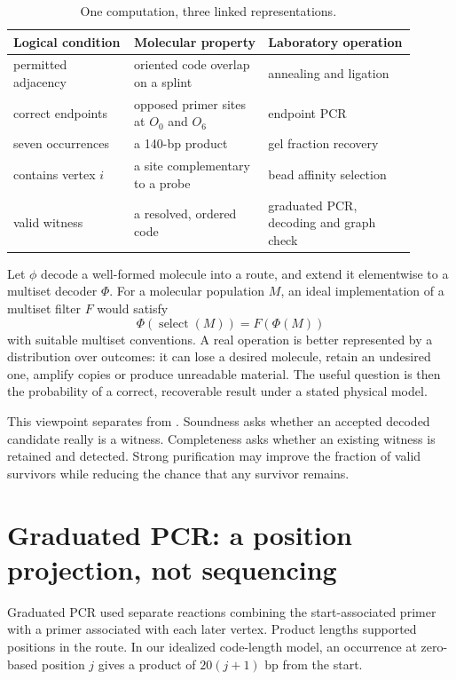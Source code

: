 \begin{table}[h]
\centering\small
\caption{One computation, three linked representations.}\label{tab:d2mapping}
\begin{tabular}{@{}p{0.27\linewidth}p{0.3\linewidth}p{0.33\linewidth}@{}}
\toprule
Logical condition & Molecular property & Laboratory operation\\
\midrule
permitted adjacency & oriented code overlap on a splint & annealing and ligation\\
correct endpoints & opposed primer sites at $O_0$ and $O_6$ & endpoint PCR\\
seven occurrences & a 140-bp product & gel fraction recovery\\
contains vertex $i$ & a site complementary to a probe & bead affinity selection\\
valid witness & a resolved, ordered code & graduated PCR, decoding and graph check\\
\bottomrule
\end{tabular}
\end{table}

Let $\phi$ decode a well-formed molecule into a route, and extend it elementwise to a multiset decoder $\Phi$. For a molecular population $M$, an ideal implementation of a multiset filter $F$ would satisfy
\[
\Phi(\operatorname{select}(M))=F(\Phi(M))
\]
with suitable multiset conventions. A real operation is better represented by a distribution over outcomes: it can lose a desired molecule, retain an undesired one, amplify copies or produce unreadable material. The useful question is then the probability of a correct, recoverable result under a stated physical model.

This viewpoint separates  from . Soundness asks whether an accepted decoded candidate really is a witness. Completeness asks whether an existing witness is retained and detected. Strong purification may improve the fraction of valid survivors while reducing the chance that any survivor remains.

\section{Graduated PCR: a position projection, not sequencing}
Graduated PCR used separate reactions combining the start-associated primer with a primer associated with each later vertex. Product lengths supported positions in the route.\cite{Adleman1994} In our idealized code-length model, an occurrence at zero-based position $j$ gives a product of $20(j+1)$ bp from the start.

